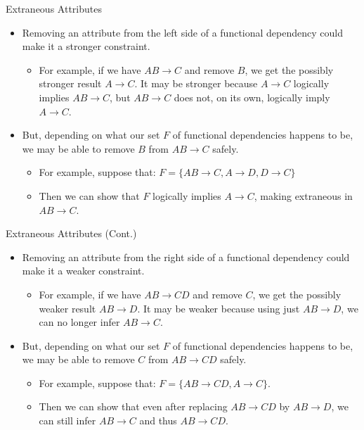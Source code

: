 \documentclass{beamer}
\begin{document}
\begin{frame}{Extraneous Attributes}
    \begin{itemize}
        \item Removing an attribute from the left side of a functional dependency could make it a stronger constraint.
            \begin{itemize}
                \item For example, if we have $AB \rightarrow C$ and remove $B$, we get the possibly stronger result $A \rightarrow C$. It may be stronger because $A \rightarrow C$ logically implies $AB \rightarrow C$, but $AB \rightarrow C$ does not, on its own, logically imply $A \rightarrow C$.
            \end{itemize}
        \item But, depending on what our set $F$ of functional dependencies happens to be, we may be able to remove $B$ from $AB \rightarrow C$ safely.
            \begin{itemize}
                \item For example, suppose that: $F = \{ AB \rightarrow C, A \rightarrow D, D \rightarrow C \}$
                \item Then we can show that $F$ logically implies $A \rightarrow C$, making extraneous in $AB \rightarrow C$.
            \end{itemize}
    \end{itemize}
\end{frame}

\begin{frame}{Extraneous Attributes (Cont.)}
    \begin{itemize}
        \item Removing an attribute from the right side of a functional dependency could make it a weaker constraint.
            \begin{itemize}
                \item For example, if we have $AB \rightarrow CD$ and remove $C$, we get the possibly weaker result $AB \rightarrow D$. It may be weaker because using just $AB \rightarrow D$, we can no longer infer $AB \rightarrow C$.
            \end{itemize}
        \item But, depending on what our set $F$ of functional dependencies happens to be, we may be able to remove $C$ from $AB \rightarrow CD$ safely.
            \begin{itemize}
                \item For example, suppose that: $F = \{ AB \rightarrow CD, A \rightarrow C \}$.
                \item Then we can show that even after replacing $AB \rightarrow CD$ by $AB \rightarrow D$, we can still infer $AB \rightarrow C$ and thus $AB \rightarrow CD$.
            \end{itemize}
    \end{itemize}
\end{frame}
\end{document}
